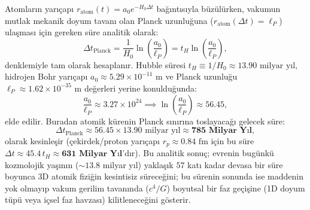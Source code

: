 \begin{corollary}
    \label{cor:planck_boyuna_inme_zamani_monograph}
    Atomların yarıçapı $r_{\mathrm{atom}}(t) = a_0 e^{-H_0 \Delta t}$ bağıntısıyla büzülürken, vakumun mutlak mekanik doyum tavanı olan Planck uzunluğuna ($r_{\mathrm{atom}}(\Delta t) = \ell_P$) ulaşması için gereken süre analitik olarak:
    \begin{equation}
        \Delta t_{\mathrm{Planck}} = \frac{1}{H_0} \ln\left( \frac{a_0}{\ell_P} \right) = t_H \ln\left( \frac{a_0}{\ell_P} \right),
        \label{eq:planck_zamani_hesap_monograph}
    \end{equation}
    denklemiyle tam olarak hesaplanır. Hubble süresi $t_H \equiv 1/H_0 \approx 13.90\text{ milyar yıl}$, hidrojen Bohr yarıçapı $a_0 \approx 5.29 \times 10^{-11}\text{ m}$ ve Planck uzunluğu $\ell_P \approx 1.62 \times 10^{-35}\text{ m}$ değerleri yerine konulduğunda:
    \begin{equation}
        \frac{a_0}{\ell_P} \approx 3.27 \times 10^{24} \implies \ln\left( \frac{a_0}{\ell_P} \right) \approx 56.45,
    \end{equation}
    elde edilir. Buradan atomik kürenin Planck sınırına toslayacağı gelecek süre:
    \begin{equation}
        \Delta t_{\mathrm{Planck}} \approx 56.45 \times 13.90\text{ milyar yıl} \approx \mathbf{785\text{ Milyar Yıl}},
        \label{eq:785_milyar_yil_monograph}
    \end{equation}
    olarak kesinleşir (çekirdek/proton yarıçapı $r_p \approx 0.84\text{ fm}$ için bu süre $\Delta t \approx 45.4 \, t_H \approx \mathbf{631\text{ Milyar Yıl}}$'dır). Bu analitik sonuç; evrenin bugünkü kozmolojik yaşının ($\sim 13.8$ milyar yıl) yaklaşık $57$ katı kadar devasa bir süre boyunca 3D atomik fiziğin kesintisiz süreceğini; bu sürenin sonunda ise maddenin yok olmayıp vakum gerilim tavanında ($c^4/G$) boyutsal bir faz geçişine (1D doyum tüpü veya içsel faz havzası) kilitleneceğini gösterir.
\end{corollary}

